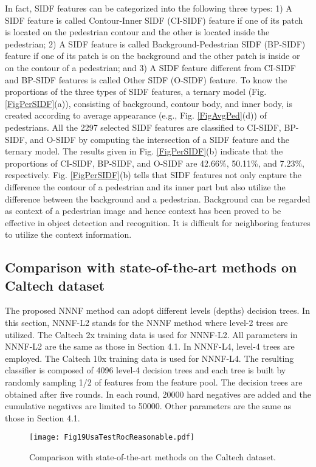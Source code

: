 \documentclass[10pt,twocolumn,letterpaper]{article}
\begin{document}
In fact, SIDF features can be categorized into the following three types: 
1) A SIDF feature is called Contour-Inner SIDF (CI-SIDF) feature if one of 
its patch is located on the pedestrian contour and the other is 
located inside the pedestrian; 2) A SIDF feature is called Background-Pedestrian 
SIDF (BP-SIDF) feature if one of its patch is on the background and the 
other patch is inside or on the contour of a pedestrian; and 3) A SIDF 
feature different from CI-SIDF and BP-SIDF features is called Other SIDF 
(O-SIDF) feature. To know the proportions of the three types of SIDF 
features, a ternary model (Fig. \ref{FigPerSIDF}(a)), consisting of background, contour body, 
and inner body, is created according to average appearance (e.g., Fig. \ref{FigAvgPed}(d)) 
of pedestrians. All the 2297 selected SIDF features are classified to 
CI-SIDF, BP-SIDF, and O-SIDF by computing the intersection of a SIDF feature 
and the ternary model. The results given in Fig. \ref{FigPerSIDF}(b) indicate that the 
proportions of CI-SIDF, BP-SIDF, and O-SIDF are 42.66{\%}, 50.11{\%}, and 
7.23{\%}, respectively. Fig. \ref{FigPerSIDF}(b) tells that SIDF features not only capture 
the difference the contour of a pedestrian and its inner part but also 
utilize the difference between the background and a pedestrian. Background 
can be regarded as context of a pedestrian image and hence context has been 
proved to be effective in object detection and recognition. It is difficult 
for neighboring features to utilize the context information. 

\subsection{Comparison with state-of-the-art methods on Caltech dataset}
The proposed NNNF method can adopt different levels (depths) decision trees. 
In this section, NNNF-L2 stands for the NNNF method where level-2 trees are 
utilized. The Caltech 2x training data is used for NNNF-L2. All parameters 
in NNNF-L2 are the same as those in Section 4.1. In NNNF-L4, level-4 trees 
are employed. The Caltech 10x training data is used for NNNF-L4. The 
resulting classifier is composed of 4096 level-4 decision trees and each 
tree is built by randomly sampling 1/2 of features from the feature pool. 
The decision trees are obtained after five rounds. In each round, 20000 hard 
negatives are added and the cumulative negatives are limited to 50000. Other 
parameters are the same as those in Section 4.1. 

\begin{figure}[!t]
\centering
\texttt{[image: Fig19UsaTestRocReasonable.pdf]}
\caption{Comparison with state-of-the-art methods on the Caltech dataset.}
\label{FigCaltech}
\end{figure}
\end{document}
